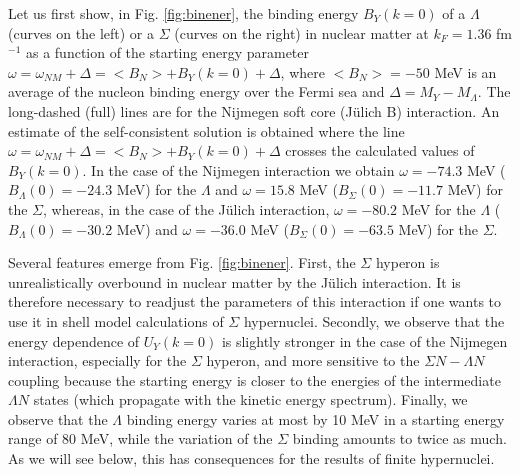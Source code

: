 Let us first show, in Fig. \ref{fig:binener}, the binding energy
$B_Y(k=0)$ of
a $\Lambda$ (curves on the left) or a $\Sigma$ (curves on the right)
in nuclear matter at $k_F=1.36$ fm$^{-1}$ as a function of the starting
energy parameter $\omega=\omega_{NM}+\Delta = <B_N> + B_Y(k=0) +
\Delta$, 
where $<B_N>=-50$
MeV is an average of
the nucleon binding energy over the Fermi sea and $\Delta=M_Y-M_\Lambda$.
The long-dashed (full) lines are for the Nijmegen soft core (J\"ulich B)
interaction. An estimate of the
self-consistent solution is obtained where the line 
$\omega=\omega_{NM}+\Delta = <B_N> + B_Y(k=0) +
\Delta$ crosses the calculated values of $B_Y(k=0)$.
In the case of the Nijmegen interaction we obtain  
$\omega=-74.3$ MeV ($B_\Lambda(0)=-24.3$ MeV) for the
$\Lambda$ and $\omega=15.8$ MeV ($B_\Sigma(0)=-11.7$ MeV) for the
$\Sigma$, 
whereas, in the case
of the J\"ulich interaction,  $\omega=-80.2$ MeV for the
$\Lambda$ ($B_\Lambda(0)=-30.2$ MeV) and $\omega=-36.0$ MeV 
($B_\Sigma(0)=-63.5$ MeV) for the $\Sigma$.

Several features emerge from Fig. \ref{fig:binener}. First,
the $\Sigma$ hyperon is unrealistically overbound in nuclear matter 
by the J\"ulich
interaction. It is therefore necessary to readjust the parameters
of this interaction if
one wants to use it in shell model calculations of $\Sigma$
hypernuclei.
Secondly, we observe that the energy dependence of $U_Y(k=0)$ is
slightly stronger in the case of the Nijmegen interaction, especially
for the $\Sigma$ hyperon, and more sensitive to the
$\Sigma N - \Lambda N$ coupling
because the starting energy is closer to the energies of the
intermediate $\Lambda N$ states (which propagate with the kinetic energy
spectrum). Finally, we observe that the $\Lambda$ binding energy 
varies at most by 10 MeV in a starting energy range of 80 MeV,
while the variation of the $\Sigma$ binding
amounts to twice as much. As we will see below, this has consequences
for the results of  finite hypernuclei.

